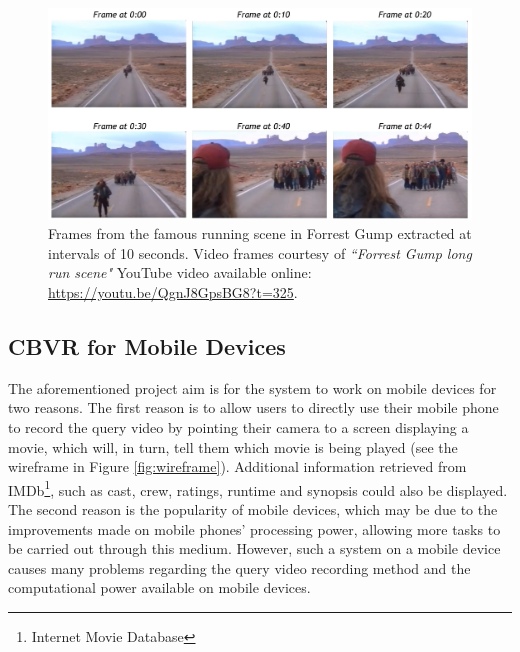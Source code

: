 \begin{figure}[h]
\centerline{\includegraphics[width=\textwidth]{figures/forrest_gump_shot.jpg}}
\caption{\label{fig:forrest_gump_frames}Frames from the famous running scene in Forrest Gump extracted at intervals of 10 seconds. Video frames courtesy of \textit{``Forrest Gump long run scene"} YouTube video available online: \url{https://youtu.be/QgnJ8GpsBG8?t=325}.}
\end{figure}

\subsection{CBVR for Mobile Devices}

The aforementioned project aim is for the system to work on mobile devices for two reasons. The first reason is to allow users to directly use their mobile phone to record the query video by pointing their camera to a screen displaying a movie, which will, in turn, tell them which movie is being played (see the wireframe in Figure \ref{fig:wireframe}). Additional information retrieved from IMDb\footnote{Internet Movie Database}, such as cast, crew, ratings, runtime and synopsis could also be displayed. The second reason is the popularity of mobile devices, which may be due to the improvements made on mobile phones' processing power, allowing more tasks to be carried out through this medium. However, such a system on a mobile device causes many problems regarding the query video recording method and the computational power available on mobile devices.\\

